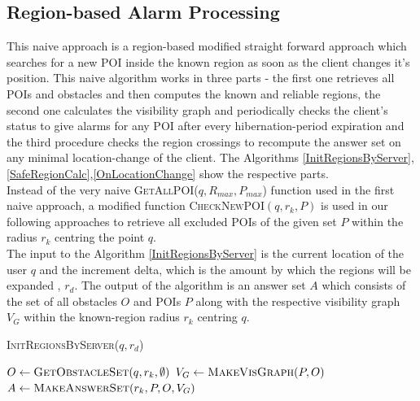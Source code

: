 \documentclass{sig-alternate}
\begin{document}
\subsection{Region-based Alarm Processing}
This naive approach is a region-based modified straight forward approach which searches for a new POI inside the known region as soon as the client changes it's position.
This naive algorithm works in three parts - the first one retrieves all POIs and obstacles and then computes the known and reliable regions, the second one calculates the visibility graph and periodically checks the client's status to give alarms for any POI after every hibernation-period expiration and the third procedure checks the region crossings to recompute the answer set on any minimal location-change of the client.
The Algorithms \ref{InitRegionsByServer},\ref{SafeRegionCalc},\ref{OnLocationChange} show the respective parts.\\
Instead of the very naive \textsc{GetAllPOI}($q, R_{max},P_{max}$) function used in the first naive approach, a modified function \textsc{CheckNewPOI}$(q, r_{k}, P)$ is used in our following approaches to retrieve all excluded POIs of the given set $P$ within the radius $r_{k}$ centring the point $q$. \\
The input to the Algorithm \ref{InitRegionsByServer} is the current location of the user $q$ and the increment delta, which is the amount by which the regions will be expanded , $r_d$. The output of the algorithm is an answer set $A$ which consists of the set of all obstacles $O$ and POIs $P$ along with the respective visibility graph $V_G$ within the known-region radius $r_{k}$ centring $q$.

\begin{algorithm}
\caption{\textsc{InitRegionsByServer}($q,r_d$)}
\label{InitRegionsByServer}

    
	 $O \gets \textsc{GetObstacleSet}(q, r_k, \emptyset)$\;
	 $V_G \gets \textsc{MakeVisGraph}(P, O)$	\;
	 \Return $A \gets \textsc{MakeAnswerSet}(r_k, P, O, V_G)$ 
\end{algorithm}
\end{document}
